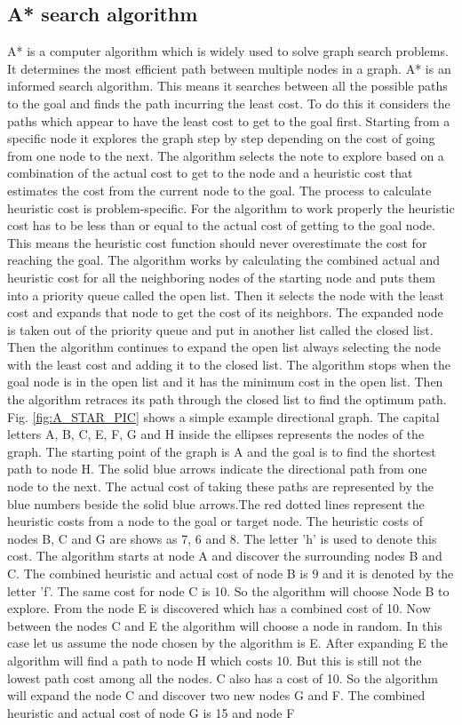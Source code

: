 \subsection{A* search algorithm}
A* is a computer algorithm which is widely used to solve graph search problems. It determines the most efficient path between multiple nodes in a graph. A* is an informed search algorithm. This means it searches between all the possible paths to the goal and finds the path incurring the least cost. To do this it considers the paths which appear to have the least cost to get to the goal first. Starting from a specific node it explores the graph step by step depending on the cost of going from one node to the next. The algorithm selects the note to explore based on a combination of the actual cost to get to the node and a heuristic cost that estimates the cost from the current node to the goal. The process to calculate heuristic cost is problem-specific. For the algorithm to work properly the heuristic cost has to be less than or equal to the actual cost of getting to the goal node. This means the heuristic cost function should never overestimate the cost for reaching the goal. The algorithm works by calculating the combined actual and heuristic cost for all the neighboring nodes of the starting node and puts them into a priority queue called the open list. Then it selects the node with the least cost and expands that node to get the cost of its neighbors. The expanded node is taken out of the priority queue and put in another list called the closed list. Then the algorithm continues to expand the open list always selecting the node with the least cost and adding it to the closed list. The algorithm stops when the goal node is in the open list and it has the minimum cost in the open list. Then the algorithm retraces its path through the closed list to find the optimum path. Fig. \ref{fig:A_STAR_PIC} shows a simple example directional graph. The capital letters A, B, C, E, F, G and H inside the ellipses represents the nodes of the graph. The starting point of the graph is A and the goal is to find the shortest path to node H. The solid blue arrows indicate the directional path from one node to the next. The actual cost of taking these paths are represented by the blue numbers beside the solid blue arrows.The red dotted lines represent the heuristic costs from a node to the goal or target node. The heuristic costs of nodes B, C and G are shows as 7, 6 and 8. The letter 'h' is used to denote this cost. The algorithm starts at node A and discover the surrounding nodes B and C. The combined heuristic and actual cost of node B is 9 and it is denoted by the letter 'f'. The same cost for node C is 10. So the algorithm will choose Node B to explore. From the node E is discovered which has a combined cost of 10. Now between the nodes C and E the algorithm will choose a node in random. In this case let us assume the node chosen by the algorithm is E. After expanding E the algorithm will find a path to node H which costs 10. But this is still not the lowest path cost among all the nodes. C also has a cost of 10. So the algorithm will expand the node C and discover two new nodes G and F. The combined heuristic and actual cost of node G is 15 and node F 